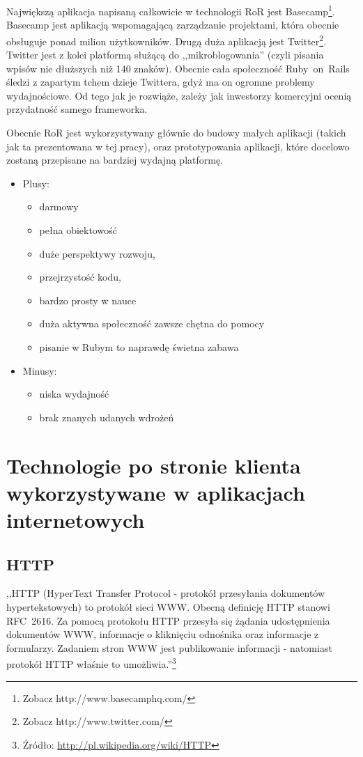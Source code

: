 \documentclass[a4paper,12pt,oneside]{report}
\begin{document}
Największą aplikacja napisaną całkowicie w technologii RoR jest Basecamp\footnote{Zobacz http://www.basecamphq.com/}. Basecamp jest aplikacją wspomagającą zarządzanie projektami, która obecnie obsługuje ponad milion użytkowników. Drugą duża aplikacją jest Twitter\footnote{Zobacz http://www.twitter.com/}. Twitter jest z kolei platformą służącą do ,,mikroblogowania'' (czyli pisania wpisów nie dłuższych niż 140 znaków). Obecnie cała społeczność Ruby~on~Rails śledzi z zapartym tchem dzieje Twittera, gdyż ma on ogromne problemy wydajnościowe. Od tego jak je rozwiąże, zależy jak inwestorzy komercyjni ocenią przydatność samego frameworka.

Obecnie RoR jest wykorzystywany głównie do budowy małych aplikacji (takich jak ta prezentowana w tej pracy), oraz prototypowania aplikacji, które docelowo zostaną przepisane na bardziej wydajną platformę.
\begin{itemize}
\item Plusy:
  \begin{itemize}
  \item darmowy
  \item pełna obiektowość
  \item duże perspektywy rozwoju, 
  \item przejrzystość kodu, 
  \item bardzo prosty w nauce
  \item duża aktywna społeczność zawsze chętna do pomocy 
  \item pisanie w Rubym to naprawdę świetna zabawa
  \end{itemize}
\item Minusy:
  \begin{itemize}
  \item niska wydajność
  \item brak znanych udanych wdrożeń
  \end{itemize}
\end{itemize}

\chapter[Technologie po stronie klienta]{Technologie po stronie klienta wykorzystywane w aplikacjach internetowych}
\label{cha:klient}

\section{HTTP}
\label{sec:http}
,,HTTP (HyperText Transfer Protocol - protokół przesyłania dokumentów hypertekstowych) to protokół sieci WWW. Obecną definicję HTTP stanowi RFC~2616. Za pomocą protokołu HTTP przesyła się żądania udostępnienia dokumentów WWW, informacje o kliknięciu odnośnika oraz informacje z formularzy. Zadaniem stron WWW jest publikowanie informacji - natomiast protokół HTTP właśnie to umożliwia.''\footnote{Źródło: \url{http://pl.wikipedia.org/wiki/HTTP}}
\end{document}
